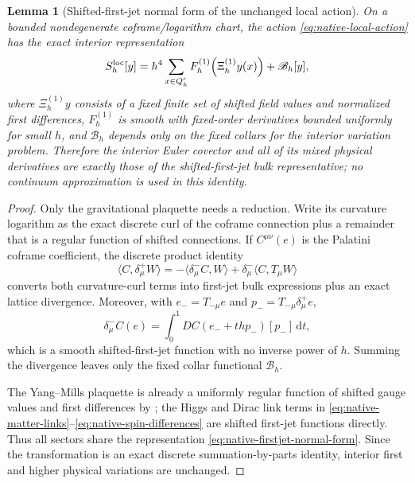 \documentclass[11pt]{article}
\numberwithin{equation}{section}
\newtheorem{lemma}[lemma]{Lemma}
\theoremstyle{definition}
\theoremstyle{remark}
\newcommand{\dd}{\mathrm d}
\newcommand{\ip}[2]{\langle#1,#2\rangle}
\begin{document}
\begin{lemma}[Shifted-first-jet normal form of the unchanged local action]
\label{lem:native-firstjet-normal-form}
On a bounded nondegenerate coframe/logarithm chart, the action \eqref{eq:native-local-action} has the exact interior representation
\begin{equation}
 S_h^{\rm loc}[y]
 =h^4\sum_{x\in Q'_h}F_h^{(1)}\!\left(\Xi_h^{(1)}y(x)\right)
 +\mathscr B_h[y],
 \label{eq:native-firstjet-normal-form}
\end{equation}
where $\Xi_h^{(1)}y$ consists of a fixed finite set of shifted field values and normalized first differences, $F_h^{(1)}$ is smooth with fixed-order derivatives bounded uniformly for small $h$, and $\mathscr B_h$ depends only on the fixed collars for the interior variation problem.  Therefore the interior Euler covector and all of its mixed physical derivatives are exactly those of the shifted-first-jet bulk representative; no continuum approximation is used in this identity.
\end{lemma}
\begin{proof}
Only the gravitational plaquette needs a reduction.  Write its curvature logarithm as the exact discrete curl of the coframe connection plus a remainder that is a regular function of shifted connections.  If $C^{\mu\nu}(e)$ is the Palatini coframe coefficient, the discrete product identity
\begin{equation}
 \ip{C}{\delta_\mu^+W}
 =-\ip{\delta_\mu^-C}{W}
   +\delta_\mu^-\ip{C}{T_\mu W}
 \label{eq:native-SBP}
\end{equation}
converts both curvature-curl terms into first-jet bulk expressions plus an exact lattice divergence.  Moreover, with $e_-=T_{-\mu}e$ and $p_-=T_{-\mu}\delta_\mu^+e$,
\begin{equation}
 \delta_\mu^-C(e)
 =\int_0^1 DC(e_-+thp_-)[p_-]\,\dd t,
 \label{eq:native-C-firstjet}
\end{equation}
which is a smooth shifted-first-jet function with no inverse power of $h$.  Summing the divergence leaves only the fixed collar functional $\mathscr B_h$.

The Yang--Mills plaquette is already a uniformly regular function of shifted gauge values and first differences by ; the Higgs and Dirac link terms in \eqref{eq:native-matter-links}--\eqref{eq:native-spin-differences} are shifted first-jet functions directly.  Thus all sectors share the representation \eqref{eq:native-firstjet-normal-form}.  Since the transformation is an exact discrete summation-by-parts identity, interior first and higher physical variations are unchanged.
\end{proof}
\end{document}
